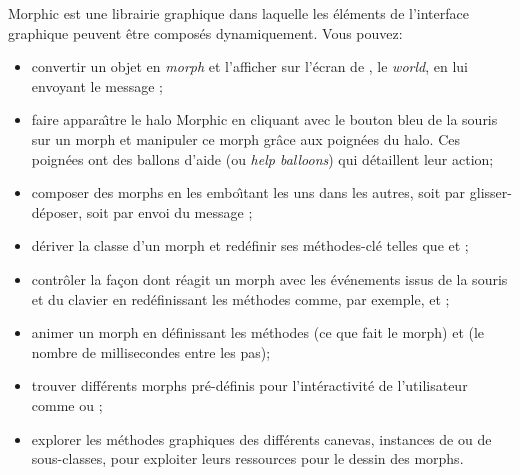 \documentclass[a4paper,10pt,twoside]{book}
\begin{document}
Morphic est une librairie graphique dans laquelle les \'el\'ements de
l'interface graphique peuvent \^etre compos\'es dynamiquement.
Vous pouvez:
\begin{itemize}
  \item convertir un objet en \emph{morph} et l'afficher
    sur l'\'ecran de \sq, le \emph{world}, en lui envoyant le message
    ;
  \item faire appara\^{\i}tre le halo Morphic en cliquant avec le
    bouton bleu de la souris sur un morph et manipuler ce morph
    gr\^ace aux poign\'ees du halo. Ces poign\'ees ont des ballons
    d'aide (ou \emph{help balloons}) qui d\'etaillent leur action;
  \item composer des morphs en les embo\^{\i}tant les uns dans les autres,
    soit par glisser-d\'eposer, soit par envoi du message ;
  \item d\'eriver la classe d'un morph et red\'efinir ses
    m\'ethodes-cl\'e telles que  et ;
  \item contr\^oler la fa\c{c}on dont r\'eagit un morph avec les
    \'ev\'enements issus de la souris et du clavier en red\'efinissant les
    m\'ethodes comme, par exemple,  et
    ;
  \item animer un morph en d\'efinissant les m\'ethodes 
    (ce que fait le morph) et  (le nombre de
    millisecondes entre les pas);
  \item trouver diff\'erents morphs pr\'e-d\'efinis pour
    l'int\'eractivit\'e de l'utilisateur comme
     ou ;
  \item explorer les m\'ethodes graphiques des diff\'erents canevas,
    instances de  ou de sous-classes,
    pour exploiter leurs ressources pour le dessin des morphs.
\end{itemize}

\ifx\wholebook\relax\else
\end{document}
